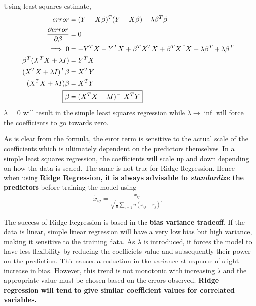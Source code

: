 \documentclass[11pt, a4paper]{article}
\begin{document}
    Using least squares estimate,
    \begin{align*}
        error &= (Y-X\beta)^{T}(Y-X\beta) + \lambda \beta^{T}\beta\\
        \frac{\partial error}{\partial \beta} &= 0\\
        \implies 0 &= -Y^{T}X - Y^{T}X + \beta^{T}X^{T}X + \beta^{T}X^{T}X + \lambda \beta^{T} + \lambda \beta^{T}\\
        \beta^{T}(X^{T}X + \lambda I) &= Y^{T}X\\
        (X^{T}X + \lambda I)^{T}\beta &= X^{T}Y\\
        (X^{T}X + \lambda I)\beta &= X^{T}Y\\
        \Aboxed{\beta &= (X^{T}X + \lambda I)^{-1}X^{T}Y}  
    \end{align*}
    $\lambda = 0$ will result in the simple least squares regression while $\lambda \to \inf$ will force the coefficients to go towards zero.\newline

    As is clear from the formula, the error term is sensitive to the actual scale of the coefficients which is ultimately dependent on the predictors themselves. In a simple least squares regression, the coefficients will scale up and down depending on how the data is scaled. The same is not true for Ridge Regression.\newline
    Hence when using \textbf{Ridge Regression, it is always advisable to \emph{standardize} the predictors} before training the model using
    \begin{align*}
        \tilde{x}_{ij} = \frac{x_{ij}}{\sqrt{\frac{1}{n}\sum_{i=1}{n}(x_{ij}-\bar{x}_{j})^{2}}}
    \end{align*}

    The success of Ridge Regression is based in the \textbf{bias variance tradeoff}. If the data is linear, simple linear regression will have a very low bias but high variance, making it sensitive to the training data. As $\lambda$ is introduced, it forces the model to have less flexibility by reducing the coefficiets value and subsequently their power on the prediction. This causes a reduction in the variance at expense of slight increase in bias. However, this trend is not monotonic with increasing $\lambda$ and the appropriate value must be chosen based on the errors observed.\newline
    \textbf{Ridge regression will tend to give similar coefficient values for correlated variables.} 
\end{document}

